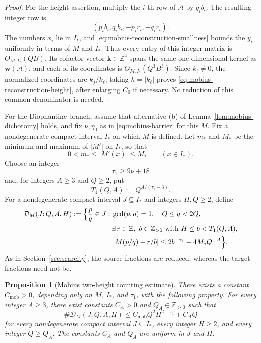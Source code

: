 \documentclass[11pt]{amsart}
\numberwithin{equation}{section}
\newtheorem{proposition}[proposition]{Proposition}
\theoremstyle{definition}
\theoremstyle{remark}
\newcommand{\Z}{\mathbb Z}
\newcommand{\abs}[1]{\left\lvert #1\right\rvert}
\begin{document}
\begin{proof}
For the height assertion, multiply the \(i\)-th row of \(\mathcal A\)
by \(q_ib_i\). The resulting integer row is
\[
(p_ib_i,q_ib_i,-p_ir_i,-q_ir_i).
\]
The numbers \(x_i\) lie in \(I_*\), and
\eqref{eq:mobius-reconstruction-smallness} bounds the \(y_i\)
uniformly in terms of \(M\) and \(I_*\). Thus every entry of this
integer matrix is \(O_{M,I_*}(QB)\). Its cofactor vector
\(\mathbf k\in\Z^4\) spans the same one-dimensional kernel as
\(\mathbf w(\mathcal A)\), and each of its coordinates is
\(O_{M,I_*}(Q^3B^3)\). Since \(k_\ell\neq0\), the normalized
coordinates are \(k_j/k_\ell\); taking \(h=|k_\ell|\) proves
\eqref{eq:mobius-reconstruction-height}, after enlarging \(C_0\) if
necessary. No reduction of this common denominator is needed.
\end{proof}

For the Diophantine branch, assume that alternative \textup{(b)} of
Lemma~\ref{lem:mobius-dichotomy} holds, and fix
\(\nu,\eta_0\) as in \eqref{eq:mobius-barrier} for this \(M\).
Fix a nondegenerate compact interval \(I_*\) on which \(M\) is defined.
Let \(m_*\) and \(M_*\) be the minimum and maximum of \(|M'|\) on
\(I_*\), so that
\begin{equation}\label{eq:mobius-derivative-bounds}
0<m_*\leq|M'(x)|\leq M_*
\qquad(x\in I_*).
\end{equation}
Choose an integer
\begin{equation}\label{eq:mobius-tau-choice}
\tau_1\geq9\nu+18
\end{equation}
and, for integers \(A\geq3\) and \(Q\geq2\), put
\begin{equation}\label{eq:mobius-T}
T_1(Q,A):=Q^{A/(\tau_1-3)}.
\end{equation}
For a nondegenerate compact interval \(J\subseteq I_*\) and integers
\(H,Q\geq2\), define
\begin{equation}\label{eq:mobius-dangerous-set}
\begin{split}
\mathcal D_M(J;Q,A,H)
:=
\Bigl\{\frac pq\in J:\;&\gcd(p,q)=1,\quad Q\leq q<2Q,\\
&\exists\,r\in\Z,\ b\in\Z_{>0}
\text{ with }H\leq b<T_1(Q,A),\\
&\abs{M(p/q)-r/b}
\leq2b^{-\tau_1}+4M_*Q^{-A}
\Bigr\}.
\end{split}
\end{equation}
As in Section~\ref{sec:scarcity}, the source fractions are reduced,
whereas the target fractions need not be.

\begin{proposition}[M\"obius two-height counting estimate]
\label{prop:mobius-scarcity}
There exists a constant \(C_{\mathrm{mob}}>0\), depending only on
\(M\), \(I_*\), and \(\tau_1\), with the following property. For every
integer \(A\geq3\), there exist constants \(C_A>0\) and \(Q_A\in\Z_{>0}\)
such that
\begin{equation}\label{eq:mobius-scarcity}
\#\mathcal D_M(J;Q,A,H)
\leq
C_{\mathrm{mob}}Q^2H^{2-\tau_1}+C_AQ
\end{equation}
for every nondegenerate compact interval \(J\subseteq I_*\), every
integer \(H\geq2\), and every integer \(Q\geq Q_A\). The constants
\(C_A\) and \(Q_A\) are uniform in \(J\) and \(H\).
\end{proposition}
\end{document}
